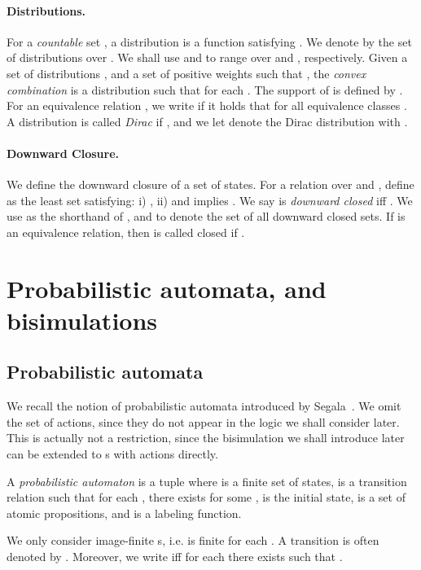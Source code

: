 \documentclass{LMCS}
\begin{document}
\paragraph{Distributions.}
For a \emph{countable} set , a distribution is a function  satisfying . We denote by
 the set of distributions over . We shall use
 and  to range over  and
, respectively. Given a set of distributions
, and a set of positive weights
 such that , the
\emph{convex combination}  is
a distribution such that  for each . The support of  is
defined by . For an
equivalence relation , we write  if it holds
that  for all equivalence classes . A
distribution  is called \emph{Dirac} if ,
and we let  denote the Dirac distribution with
.


\paragraph{Downward Closure.} We define the downward closure of
a set of states.
For a relation  over  and , define
 as the least set satisfying:
i) , ii)  and
 implies .
We say  is  \emph{downward closed} iff .
We use  as the shorthand of , 
and  to 
denote the set of all  downward closed sets. If  is an equivalence
relation, then  is called  closed if .

\section{Probabilistic automata, \texorpdfstring{}{PCTL*} and bisimulations}\label{sec:pa}
\subsection{Probabilistic automata}
We recall the notion of probabilistic automata introduced by Segala~\cite{Segala-thesis}.  We omit the set of actions, since they do not
appear in the logic  we shall consider later. This is actually not
a restriction, since the bisimulation we shall introduce later
can be extended to s with
actions directly.
\begin{defi}\label{def:automata}
  A \emph{probabilistic automaton} is a tuple
   where  is a finite set of
  states,  is a
  transition relation such that for each , 
  there exists  for some , 
   is the initial state,
   is a set of atomic propositions, and  is a labeling function.
\end{defi}
We only consider image-finite s, i.e.
 is finite for each . A transition
 is often denoted by . Moreover, we
write  iff for each 
there exists  such that
.
\end{document}
